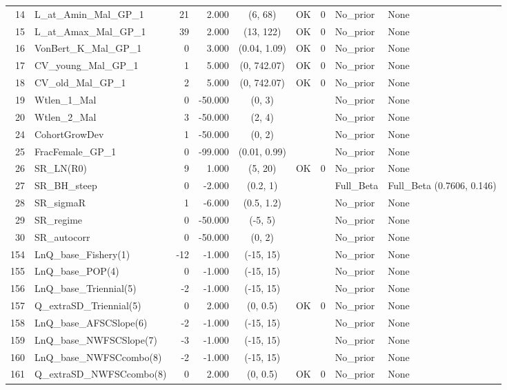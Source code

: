 \documentclass[12pt,]{article}
\begin{document}
\begin{landscape}
\begin{longtable}{rlrrcccll}
  14 & L\_at\_Amin\_Mal\_GP\_1 & 21 & 2.000 & (6, 68) & OK & 0 & No\_prior & None \\ 
  15 & L\_at\_Amax\_Mal\_GP\_1 & 39 & 2.000 & (13, 122) & OK & 0 & No\_prior & None \\ 
  16 & VonBert\_K\_Mal\_GP\_1 & 0 & 3.000 & (0.04, 1.09) & OK & 0 & No\_prior & None \\ 
  17 & CV\_young\_Mal\_GP\_1 & 1 & 5.000 & (0, 742.07) & OK & 0 & No\_prior & None \\ 
  18 & CV\_old\_Mal\_GP\_1 & 2 & 5.000 & (0, 742.07) & OK & 0 & No\_prior & None \\ 
  19 & Wtlen\_1\_Mal & 0 & -50.000 & (0, 3) &  &  & No\_prior & None \\ 
  20 & Wtlen\_2\_Mal & 3 & -50.000 & (2, 4) &  &  & No\_prior & None \\ 
  24 & CohortGrowDev & 1 & -50.000 & (0, 2) &  &  & No\_prior & None \\ 
  25 & FracFemale\_GP\_1 & 0 & -99.000 & (0.01, 0.99) &  &  & No\_prior & None \\ 
  26 & SR\_LN(R0) & 9 & 1.000 & (5, 20) & OK & 0 & No\_prior & None \\ 
  27 & SR\_BH\_steep & 0 & -2.000 & (0.2, 1) &  &  & Full\_Beta & Full\_Beta (0.7606, 0.146) \\ 
  28 & SR\_sigmaR & 1 & -6.000 & (0.5, 1.2) &  &  & No\_prior & None \\ 
  29 & SR\_regime & 0 & -50.000 & (-5, 5) &  &  & No\_prior & None \\ 
  30 & SR\_autocorr & 0 & -50.000 & (0, 2) &  &  & No\_prior & None \\ 
  154 & LnQ\_base\_Fishery(1) & -12 & -1.000 & (-15, 15) &  &  & No\_prior & None \\ 
  155 & LnQ\_base\_POP(4) & 0 & -1.000 & (-15, 15) &  &  & No\_prior & None \\ 
  156 & LnQ\_base\_Triennial(5) & -2 & -1.000 & (-15, 15) &  &  & No\_prior & None \\ 
  157 & Q\_extraSD\_Triennial(5) & 0 & 2.000 & (0, 0.5) & OK & 0 & No\_prior & None \\ 
  158 & LnQ\_base\_AFSCSlope(6) & -2 & -1.000 & (-15, 15) &  &  & No\_prior & None \\ 
  159 & LnQ\_base\_NWFSCSlope(7) & -3 & -1.000 & (-15, 15) &  &  & No\_prior & None \\ 
  160 & LnQ\_base\_NWFSCcombo(8) & -2 & -1.000 & (-15, 15) &  &  & No\_prior & None \\ 
  161 & Q\_extraSD\_NWFSCcombo(8) & 0 & 2.000 & (0, 0.5) & OK & 0 & No\_prior & None \\ 

\end{longtable}
\end{landscape}
\end{document}
